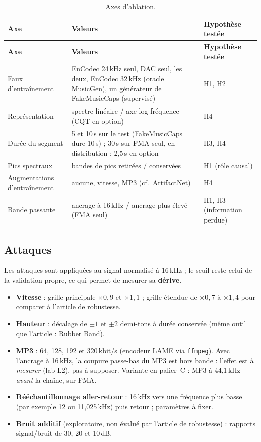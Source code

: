 \documentclass[11pt,a4paper]{article}
\begin{document}
{\small
\begin{longtable}{L{3.2cm}L{7.2cm}L{3.5cm}}
\caption{Axes d'ablation.}\label{tab:ablations}\\
\toprule
\textbf{Axe} & \textbf{Valeurs} & \textbf{Hypothèse testée}\\
\midrule
\endfirsthead
\toprule
\textbf{Axe} & \textbf{Valeurs} & \textbf{Hypothèse testée}\\
\midrule
\endhead
\bottomrule
\endfoot
Faux d'entraînement & EnCodec 24\,kHz seul, DAC seul, les deux, EnCodec 32\,kHz (oracle MusicGen), un générateur de FakeMusicCaps (supervisé) & H1, H2\\
Représentation & spectre linéaire / axe log-fréquence (CQT en option) & H4\\
Durée du segment & 5 et 10\,s sur le test (FakeMusicCaps dure 10\,s) ; 30\,s sur FMA seul, en distribution ; 2,5\,s en option & H3, H4\\
Pics spectraux & bandes de pics retirées / conservées & H1 (rôle causal)\\
Augmentations d'entraînement & aucune, vitesse, MP3 (cf.\ ArtifactNet) & H4\\
Bande passante & ancrage à 16\,kHz / ancrage plus élevé (FMA seul) & H1, H3 (information perdue)\\
\end{longtable}
}

\subsection{Attaques}

Les attaques sont appliquées au signal normalisé à 16\,kHz ; le seuil reste celui de la validation propre, ce qui permet de mesurer sa \textbf{dérive}.

\begin{itemize}
  \item \textbf{Vitesse} : grille principale $\times 0{,}9$ et $\times 1{,}1$ ; grille étendue de $\times 0{,}7$ à $\times 1{,}4$ pour comparer à l'article de robustesse.
  \item \textbf{Hauteur} : décalage de $\pm 1$ et $\pm 2$ demi-tons à durée conservée (même outil que l'article : Rubber Band).
  \item \textbf{MP3} : 64, 128, 192 et 320\,kbit/s (encodeur LAME via \texttt{ffmpeg}). Avec l'ancrage à 16\,kHz, la coupure passe-bas du MP3 est hors bande : l'effet est à \emph{mesurer} (lab L2), pas à supposer. Variante en palier~C : MP3 à 44,1\,kHz \emph{avant} la chaîne, sur FMA.
  \item \textbf{Rééchantillonnage aller-retour} : 16\,kHz vers une fréquence plus basse (par exemple 12 ou 11,025\,kHz) puis retour ; paramètres à fixer.
  \item \textbf{Bruit additif} (exploratoire, non évalué par l'article de robustesse) : rapports signal/bruit de 30, 20 et 10\,dB.
\end{itemize}
\end{document}
